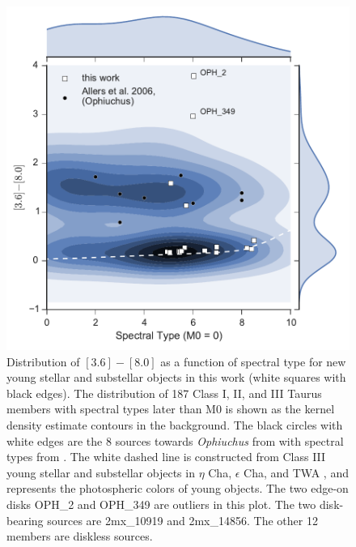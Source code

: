 \begin{figure}[ht!]
  \caption{ Distribution of $[3.6]-[8.0]$ as a function of spectral type for new young stellar and substellar objects in this work (white squares with black edges).  The distribution of 187 Class I, II, and III Taurus members with spectral types later than M0 \citep{2010ApJS..186..111L} is shown as the kernel density estimate contours in the background.  The black circles with white edges are the 8 sources towards \emph{Ophiuchus} from \citet{allers06} with spectral types from \citet{2011ASPC..448..633G}.  The white dashed line is constructed from Class III young stellar and substellar objects in $\eta$ Cha, $\epsilon$ Cha, and TWA \citep{2010ApJS..186..111L}, and represents the photospheric colors of young objects.  The two edge-on disks OPH\_2 and OPH\_349 are outliers in this plot.  The two disk-bearing sources are 2mx\_10919 and 2mx\_14856.  The other 12 members are diskless sources.  \label{fig_I1_I4_density} }
\centering
\includegraphics[scale=0.6]{chIMACS/figures/I1_I4_density.pdf}
\end{figure}

